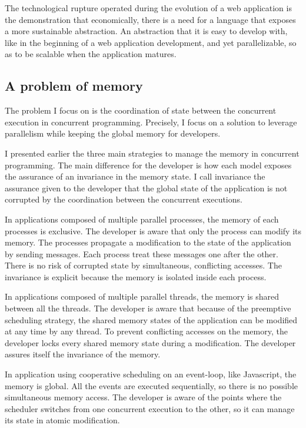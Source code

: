 
The technological rupture operated during the evolution of a web application is the demonstration that economically, there is a need for a language that exposes a more sustainable abstraction.
An abstraction that it is easy to develop with, like in the beginning of a web application development, and yet parallelizable, so as to be scalable when the application matures.

\subsection{A problem of memory}

The problem I focus on is the coordination of state between the concurrent execution in concurrent programming.
Precisely, I focus on a solution to leverage parallelism while keeping the global memory for developers.

I presented earlier the three main strategies to manage the memory in concurrent programming.
The main difference for the developer is how each model exposes the assurance of an invariance in the memory state.
I call invariance the assurance given to the developer that the global state of the application is not corrupted by the coordination between the concurrent executions.

In applications composed of multiple parallel processes, the memory of each processes is exclusive.
The developer is aware that only the process can modify its memory.
The processes propagate a modification to the state of the application by sending messages.
Each process treat these messages one after the other.
There is no risk of corrupted state by simultaneous, conflicting accesses.
The invariance is explicit because the memory is isolated inside each process.

In applications composed of multiple parallel threads, the memory is shared between all the threads.
The developer is aware that because of the preemptive scheduling strategy, the shared memory states of the application can be modified at any time by any thread.
To prevent conflicting accesses on the memory, the developer locks every shared memory state during a modification.
The developer assures itself the invariance of the memory.

In application using cooperative scheduling on an event-loop, like Javascript, the memory is global.
All the events are executed sequentially, so there is no possible simultaneous memory access.
The developer is aware of the points where the scheduler switches from one concurrent execution to the other, so it can manage its state in atomic modification.


